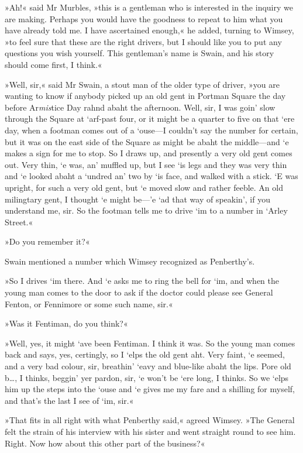 »Ah!« said Mr Murbles, »this is a gentleman who is interested in the inquiry we are making. Perhaps you would have the goodness to repeat to him what you have already told me. I have ascertained enough,« he added, turning to Wimsey, »to feel sure that these are the right drivers, but I should like you to put any questions you wish yourself. This gentleman's name is Swain, and his story should come first, I think.«

»Well, sir,« said Mr Swain, a stout man of the older type of driver, »you are wanting to know if anybody picked up an old gent in Portman Square the day before Ar\textit{mis}tice Day rahnd abaht the afternoon. Well, sir, I was goin' slow through the Square at `arf-past four, or it might be a quarter to five on that `ere day, when a footman comes out of a `ouse—I couldn't say the number for certain, but it was on the east side of the Square as might be abaht the middle—and `e makes a sign for me to stop. So I draws up, and presently a very old gent comes out. Very thin, `e was, an' muffled up, but I see `is legs and they was very thin and `e looked abaht a `undred an' two by `is face, and walked with a stick. `E was upright, for such a very old gent, but `e moved slow and rather feeble. An old milingtary gent, I thought `e might be—'e `ad that way of speakin', if you understand me, sir. So the footman tells me to drive `im to a number in `Arley Street.«

»Do you remember it?«

Swain mentioned a number which Wimsey recognized as Penberthy's.

»So I drives `im there. And `e asks me to ring the bell for `im, and when the young man comes to the door to ask if the doctor could please see General Fenton, or Fennimore or some such name, sir.«

»Was it Fentiman, do you think?«

»Well, yes, it might `ave been Fentiman. I think it was. So the young man comes back and says, yes, certingly, so I `elps the old gent aht. Very faint, `e seemed, and a very bad colour, sir, breathin' `eavy and blue-like abaht the lips. Pore old b\dots, I thinks, beggin' yer pardon, sir, `e won't be `ere long, I thinks. So we `elps him up the steps into the `ouse and `e gives me my fare and a shilling for myself, and that's the last I see of `im, sir.«

»That fits in all right with what Penberthy said,« agreed Wimsey. »The General felt the strain of his interview with his sister and went straight round to see him. Right. Now how about this other part of the business?«

